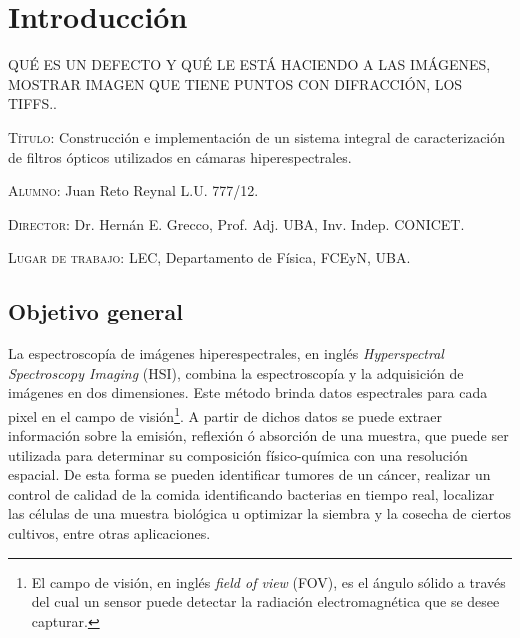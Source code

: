 \documentclass{ctuthesis}
\begin{document}
\maketitle

\renewcommand{\chaptername}{Capítulo}
\renewcommand{\figurename}{Figura}


\setlength{\parindent}{0.5cm}
\setlength{\parskip}{1em}




\chapter{Introducción}
QUÉ ES UN DEFECTO Y QUÉ LE ESTÁ HACIENDO A LAS IMÁGENES, MOSTRAR IMAGEN QUE TIENE PUNTOS CON DIFRACCIÓN, LOS TIFFS..

\textsc{Título:} Construcción e implementación de un sistema integral de 
caracterización de filtros ópticos utilizados en cámaras hiperespectrales.


\hspace{-0.4cm}\textsc{Alumno:} Juan Reto Reynal L.U. 777/12.

\hspace{-0.4cm}\textsc{Director:} Dr. Hernán E. Grecco, 
Prof. Adj. UBA, Inv. Indep. CONICET.

\hspace{-0.4cm}\textsc{Lugar de trabajo:} LEC, Departamento de Física, FCEyN, UBA.


\section*{Objetivo general}
\hspace{0.5cm}La espectroscopía de imágenes hiperespectrales, en inglés 
\textit{Hyperspectral 
Spectroscopy Imaging} (HSI), combina la espectroscopía y la adquisición de 
imágenes 
en dos dimensiones. Este método brinda datos espectrales para cada 
pixel en el campo de 
visión\footnote{El campo de visión, en inglés \textit{field of view} (FOV), es 
el ángulo sólido a través del cual un sensor puede detectar la radiación 
electromagnética que se desee capturar.}. A partir de dichos 
datos se puede extraer información sobre la emisión, reflexión ó absorción de 
una muestra, que puede ser utilizada para determinar su 
composición físico-química con una resolución espacial. De esta forma se pueden 
identificar tumores de un cáncer, realizar un control de calidad de la comida 
identificando bacterias en tiempo real, localizar las células de una muestra 
biológica u optimizar la siembra y la cosecha de ciertos cultivos, entre otras 
aplicaciones.
\end{document}
